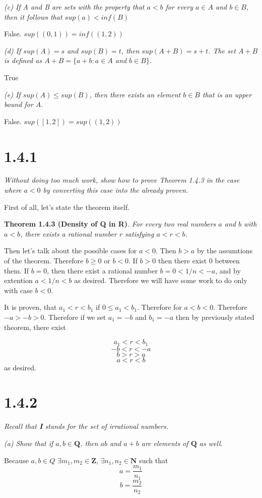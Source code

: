 \documentclass[11pt,oneside,titlepage]{book}
\begin{document}
\textit{(c) If A and B are sets with the property that $a < b$ for every
  $a \in A$ and $b \in B$, then it follows that $sup(a) < inf(B)$}

False. $sup((0,1)) = inf((1, 2))$

\textit{(d) If $sup(A) = s$ and $sup(B) = t$, then $sup(A + B) = s + t$. The
  set $A + B$ is defined as $A + B = \{a + b: a \in A$ and $b \in B\}$.}

True

\textit{(e) If $sup(A) \leq sup(B)$, then there exists an element $b \in B$
  that is an upper bound for $A$.}

False. $sup([1, 2]) = sup((1, 2))$

\section*{1.4.1}
\textit{Without doing too much work, show how to prove Theorem 1.4.3 in the
  case where $a < 0$ by converting this case into the already proven.}

First of all, let's state the theorem itself.

\textbf{Theorem 1.4.3 (Density of Q in R)}.
\textit{For every two real numbers $a$ and $b$ with $a < b$, there exists a
  rational number $r$ satisfying $a < r < b$.}

Then let's talk about the possible cases for $a < 0$. Then $b > a$ by the
assumtions of the theorem. Therefore $b \geq 0$ or $b < 0$. If $b > 0$ then
there exist 0 between them. If $b = 0$, then there exist a rational number
$b = 0 < 1/n < -a$, and by extention $a < 1/n < b$ as desired. Therefore we
will have some work to do  only with case $b < 0$.

It is  proven, that $a_1 < r < b_1$ if $0 \leq a_1 < b_1$. Therefore for
$a < b < 0$. Therefore $-a > -b > 0$. Therefore if we set $a_1 = -b$ and
$b_1 = -a$ then by previously stated theorem, there exist

$$a_1 < r < b_1$$
$$-b  < r < -a$$
$$b  > r > a$$
$$a < r < b$$
as desired.

\section*{1.4.2}
\textit{Recall that \textbf{I} stands for the set of irrational numbers.}

\textit{(a) Show that if $a,b \in \textbf{Q}$, then $ab$ and $a + b$ are
  elements of $\textbf{Q}$ as well.}

Because $a,b \in Q$ $\exists m_1,m_2 \in \textbf{Z}$, $\exists n_1,n_2 \in
\textbf{N}$ such that
$$a = \frac{m_1}{n_1}$$
$$b = \frac{m_2}{n_2}$$
\end{document}

